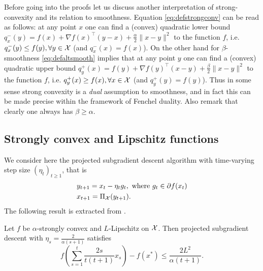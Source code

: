 Before going into the proofs let us discuss another interpretation of strong-convexity and its relation to smoothness. Equation \eqref{eq:defstrongconv} can be read as follows: at any point $x$ one can find a (convex) quadratic lower bound $q_x^-(y) = f(x) + \nabla f(x)^{\top} (y - x) + \frac{\alpha}{2} \|x - y \|^2$ to the function $f$, i.e. $q_x^-(y) \leq f(y), \forall y \in \mathcal{X}$ (and $q_x^-(x) = f(x)$). On the other hand for $\beta$-smoothness \eqref{eq:defaltsmooth}
%
implies that at any point $y$ one can find a (convex) quadratic upper bound $q_y^+(x) = f(y) + \nabla f(y)^{\top} (x - y) + \frac{\beta}{2} \|x - y \|^2$ to the function $f$, i.e. $q_y^+(x) \geq f(x), \forall x \in \mathcal{X}$ (and $q_y^+(y) = f(y)$). 
Thus in some sense strong convexity is a {\em dual} assumption to smoothness, and in fact this can be made precise within the framework of Fenchel duality. Also remark that clearly one always has $\beta \geq \alpha$.

\subsection{Strongly convex and Lipschitz functions}
We consider here the projected subgradient descent algorithm with time-varying step size $(\eta_t)_{t \geq 1}$, that is
\begin{align*}
& y_{t+1} = x_t - \eta_t g_t , \ \text{where} \ g_t \in \partial f(x_t) \\
& x_{t+1} = \Pi_{\mathcal{X}}(y_{t+1}) .
\end{align*}
The following result is extracted from \cite{LJSB12}.

\begin{theorem} \label{th:LJSB12}
Let $f$ be $\alpha$-strongly convex and $L$-Lipschitz on $\mathcal{X}$. Then projected subgradient descent with $\eta_s = \frac{2}{\alpha (s+1)}$ satisfies
$$f \left(\sum_{s=1}^t \frac{2 s}{t(t+1)} x_s \right) - f(x^*) \leq \frac{2 L^2}{\alpha (t+1)} .$$
\end{theorem}

